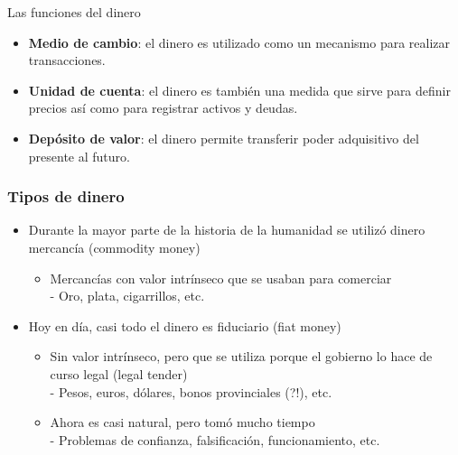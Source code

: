 \documentclass{beamer}
\begin{document}


\begin{frame}{ Las funciones del dinero}
    \begin{itemize}
       \item \textbf{Medio de cambio}: el dinero es utilizado como un mecanismo para realizar transacciones. 
  \vspace{1mm}
    \item \textbf{Unidad de cuenta}: el dinero es también una medida que sirve para definir precios así como para registrar activos y deudas.
  \vspace{1mm}  
    \item \textbf{Depósito de valor}: el dinero permite transferir poder adquisitivo del presente al futuro. 
   \end{itemize}
\end{frame}

\begin{frame}
\frametitle{Tipos de dinero}
\begin{itemize}
    \item Durante la mayor parte de la historia de la humanidad se utilizó dinero mercancía (commodity money)
        \begin{itemize}
        \item Mercancías con valor intrínseco que se usaban para comerciar \\
        - Oro, plata, cigarrillos, etc.
        \end{itemize} \vspace{1mm}
    \item Hoy en día, casi todo el dinero es fiduciario (fiat money)               \begin{itemize}
        \item Sin valor intrínseco, pero que se utiliza porque el gobierno lo hace de curso legal (legal tender) \\
        - Pesos, euros, dólares, bonos provinciales (?!), etc.
        \item Ahora es casi natural, pero tomó mucho tiempo \\
        - Problemas de confianza, falsificación, funcionamiento, etc.
        \end{itemize}
\end{itemize}
\end{frame}
\end{document}
